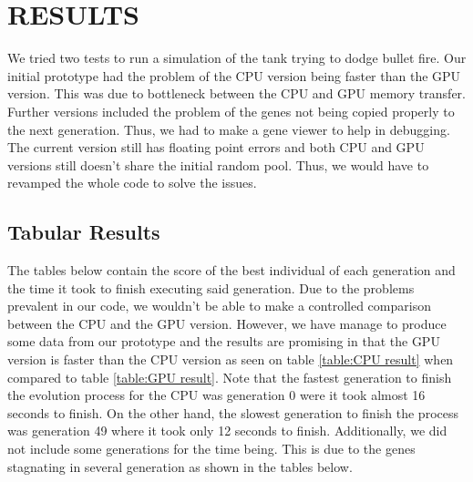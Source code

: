 \chapter{RESULTS}
We tried two tests to run a simulation of the tank trying to dodge bullet fire.
Our initial prototype had the problem of the CPU version being faster than the
GPU version. This was due to bottleneck between the CPU and GPU memory transfer.
Further versions included the problem of the genes not being copied properly
to the next generation. Thus, we had to make a gene viewer to help in debugging.
The current version still has floating point errors and both CPU and GPU versions
still doesn't share the initial random pool. Thus, we would have to revamped the 
whole code to solve the issues.


\section{Tabular Results} 
The tables below contain the score of the best individual of each generation and
the time it took to finish executing said generation. Due to the problems prevalent
in our code, we wouldn't be able to make a controlled comparison between the CPU
and the GPU version. However, we have manage to produce some data from our prototype
and the results are promising in that the GPU version is faster than the CPU version 
as seen on table \ref{table:CPU result} when compared to table \ref{table:GPU result}.
Note that the fastest generation to finish the evolution process for the CPU was generation
0 were it took almost 16 seconds to finish. On the other hand, the slowest generation
to finish the process was generation 49 where it took only 12 seconds to finish.
Additionally, we did not include some generations for the time being. This is due to
the genes stagnating in several generation as shown in the tables below.


